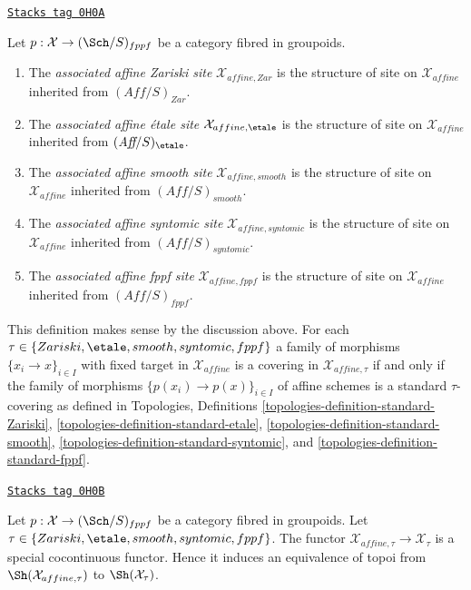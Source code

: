 \begin{definition}
\label{stacks-sheaves-definition-alternative-inherited-topologies}
\href{https://stacks.math.columbia.edu/tag/0H0A}{\texttt{Stacks tag 0H0A}}

Let $p : \mathcal{X} \to (\Sch/S)_{fppf}$ be a category fibred in groupoids.
\begin{enumerate}
\item The {\it associated affine Zariski site} $\mathcal{X}_{affine, Zar}$
is the structure of site on $\mathcal{X}_{affine}$ inherited from
$(\textit{Aff}/S)_{Zar}$.
\item The {\it associated affine \'etale site} $\mathcal{X}_{affine, \etale}$
is the structure of site on $\mathcal{X}_{affine}$ inherited from
$(\textit{Aff}/S)_\etale$.
\item The {\it associated affine smooth site}
$\mathcal{X}_{affine, smooth}$
is the structure of site on $\mathcal{X}_{affine}$ inherited from
$(\textit{Aff}/S)_{smooth}$.
\item The {\it associated affine syntomic site} $\mathcal{X}_{affine, syntomic}$
is the structure of site on $\mathcal{X}_{affine}$ inherited from
$(\textit{Aff}/S)_{syntomic}$.
\item The {\it associated affine fppf site} $\mathcal{X}_{affine, fppf}$
is the structure of site on $\mathcal{X}_{affine}$ inherited from
$(\textit{Aff}/S)_{fppf}$.
\end{enumerate}
\end{definition}

This definition makes sense by the discussion above. For each
$\tau \in \{Zariski, \etale, smooth, syntomic, fppf\}$ a
family of morphisms $\{x_i \to x\}_{i \in I}$ with fixed target
in $\mathcal{X}_{affine}$ is a covering in $\mathcal{X}_{affine, \tau}$
if and only if the family of morphisms $\{p(x_i) \to p(x)\}_{i \in I}$
of affine schemes is a standard $\tau$-covering as defined in
Topologies, Definitions
\ref{topologies-definition-standard-Zariski},
\ref{topologies-definition-standard-etale},
\ref{topologies-definition-standard-smooth},
\ref{topologies-definition-standard-syntomic}, and
\ref{topologies-definition-standard-fppf}.

\begin{lemma}[Alternative]
\label{stacks-sheaves-lemma-alternative}
\href{https://stacks.math.columbia.edu/tag/0H0B}{\texttt{Stacks tag 0H0B}}

Let $p : \mathcal{X} \to (\Sch/S)_{fppf}$ be a category fibred in groupoids.
Let $\tau \in \{Zariski, \etale, smooth, syntomic, fppf\}$. The functor
$\mathcal{X}_{affine, \tau} \to \mathcal{X}_\tau$ is a special
cocontinuous functor. Hence it induces an equivalence of topoi
from $\Sh(\mathcal{X}_{affine, \tau})$ to $\Sh(\mathcal{X}_\tau)$.
\end{lemma}


